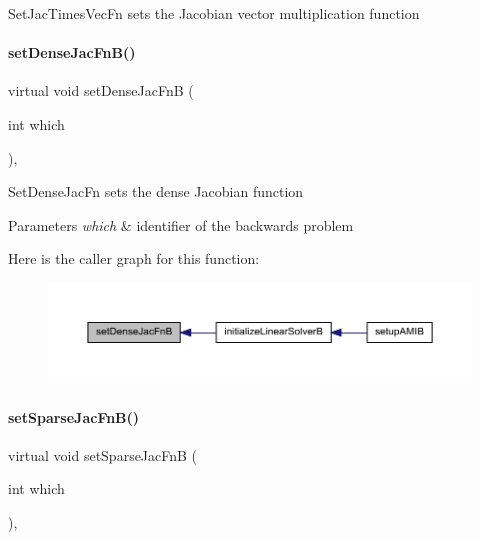 Set\+Jac\+Times\+Vec\+Fn sets the Jacobian vector multiplication function \mbox{\label{classamici_1_1_solver_a1081b1ac835a2bf9221552a07d04ef4d}} 
\paragraph{\texorpdfstring{set\+Dense\+Jac\+Fn\+B()}{setDenseJacFnB()}}
{\footnotesize\ttfamily virtual void set\+Dense\+Jac\+FnB (\begin{DoxyParamCaption}\item[{int}]{which }\end{DoxyParamCaption})\hspace{0.3cm}{\ttfamily [protected]}, {}}

Set\+Dense\+Jac\+Fn sets the dense Jacobian function


\begin{DoxyParams}{Parameters}
{\em which} & identifier of the backwards problem \\
\hline
\end{DoxyParams}
Here is the caller graph for this function\+:
\nopagebreak
\begin{figure}[H]
\begin{center}
\leavevmode
\includegraphics[width=350pt]{classamici_1_1_solver_a1081b1ac835a2bf9221552a07d04ef4d_icgraph}
\end{center}
\end{figure}
\mbox{\label{classamici_1_1_solver_a101c62151da172cc06a025a3060b50de}} 
\paragraph{\texorpdfstring{set\+Sparse\+Jac\+Fn\+B()}{setSparseJacFnB()}}
{\footnotesize\ttfamily virtual void set\+Sparse\+Jac\+FnB (\begin{DoxyParamCaption}\item[{int}]{which }\end{DoxyParamCaption})\hspace{0.3cm}{\ttfamily [protected]}, {}}

